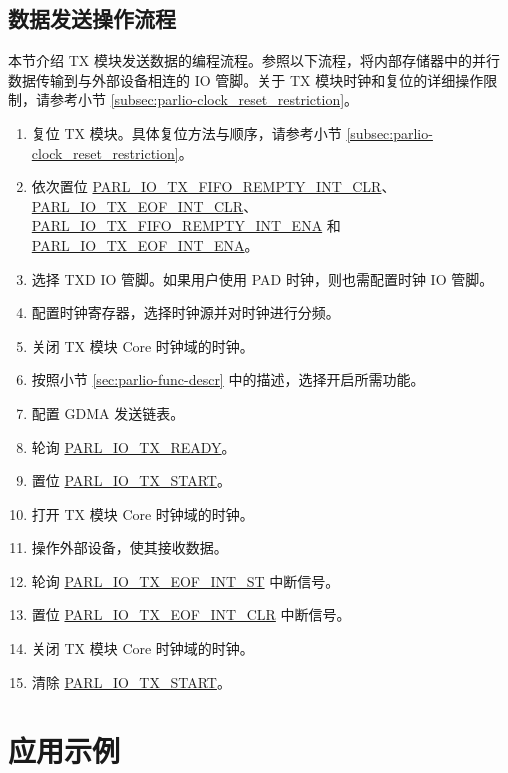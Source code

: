 \documentclass[main\_\_CN.tex]{subfiles}
\begin{document}
\subsection{数据发送操作流程}

本节介绍 TX 模块发送数据的编程流程。参照以下流程，将内部存储器中的并行数据传输到与外部设备相连的 IO 管脚。关于 TX 模块时钟和复位的详细操作限制，请参考小节 \ref{subsec:parlio-clock_reset_restriction}。

\begin{enumerate}
    \item 复位 TX 模块。具体复位方法与顺序，请参考小节 \ref{subsec:parlio-clock_reset_restriction}。
    \item 依次置位 \hyperref[fielddesc:PARLIOTXFIFOREMPTYINTCLR]{PARL\_IO\_TX\_FIFO\_REMPTY\_INT\_CLR}、\hyperref[fielddesc:PARLIOTXEOFINTCLR]{PARL\_IO\_TX\_EOF\_INT\_CLR}、\hyperref[fielddesc:PARLIOTXFIFOREMPTYINTENA]{PARL\_IO\_TX\_FIFO\_REMPTY\_INT\_ENA} 和 \hyperref[fielddesc:PARLIOTXEOFINTENA]{PARL\_IO\_TX\_EOF\_INT\_ENA}。
    \item 选择 TXD IO 管脚。如果用户使用 PAD 时钟，则也需配置时钟 IO 管脚。
    \item 配置时钟寄存器，选择时钟源并对时钟进行分频。
    \item 关闭 TX 模块 Core 时钟域的时钟。
    \item 按照小节 \ref{sec:parlio-func-descr} 中的描述，选择开启所需功能。
    \item 配置 GDMA 发送链表。
    \item 轮询 \hyperref[fielddesc:PARLIOTXREADY]{PARL\_IO\_TX\_READY}。
    \item 置位 \hyperref[fielddesc:PARLIOTXSTART]{PARL\_IO\_TX\_START}。
    \item 打开 TX 模块 Core 时钟域的时钟。
    \item 操作外部设备，使其接收数据。
    \item 轮询 \hyperref[fielddesc:PARLIOTXEOFINTST]{PARL\_IO\_TX\_EOF\_INT\_ST} 中断信号。
    \item 置位 \hyperref[fielddesc:PARLIOTXEOFINTCLR]{PARL\_IO\_TX\_EOF\_INT\_CLR} 中断信号。
    \item 关闭 TX 模块 Core 时钟域的时钟。
    \item 清除 \hyperref[fielddesc:PARLIOTXSTART]{PARL\_IO\_TX\_START}。
\end{enumerate}


\section{应用示例}
\label{sec:parlio-application-example}
\end{document}
